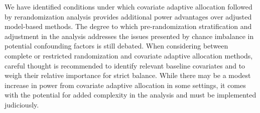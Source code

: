 We have identified conditions under which covariate adaptive allocation followed by rerandomization analysis provides additional power advantages over adjusted model-based methods.
The degree to which pre-randomization stratification and adjustment in the analysis addresses the issues presented by chance imbalance in potential confounding factors is still debated.
When considering between complete or restricted randomization and covariate adaptive allocation methods, careful thought is recommended to identify relevant baseline covariates and to weigh their relative importance for strict balance.
While there may be a modest increase in power from covariate adaptive allocation in some settings, it comes with the potential for added complexity in the analysis and must be implemented judiciously. 

